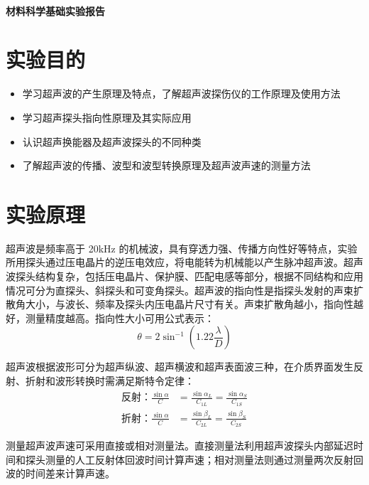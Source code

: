 \documentclass[a4paper,utf8]{article}
\begin{document}
\begin{center}
    {\mbox{}\\[7em]\bfseries\songti%
    材料科学基础实验报告}\\[34mm]
    \pointingbox
\end{center}\newpage
\section{实验目的}
    \begin{itemize}
        \item 学习超声波的产生原理及特点，了解超声波探伤仪的工作原理及使用方法 
        \item 学习超声探头指向性原理及其实际应用
        \item 认识超声换能器及超声波探头的不同种类
        \item 了解超声波的传播、波型和波型转换原理及超声波声速的测量方法
    \end{itemize}
\section{实验原理}%
    超声波是频率高于 20kHz 的机械波，具有穿透力强、传播方向性好等特点，实验所用探头通过压电晶片的逆压电效应，将电能转为机械能以产生脉冲超声波。超声波探头结构复杂，包括压电晶片、保护膜、匹配电感等部分，根据不同结构和应用情况可分为直探头、斜探头和可变角探头。超声波的指向性是指探头发射的声束扩散角大小，与波长、频率及探头内压电晶片尺寸有关。声束扩散角越小，指向性越好，测量精度越高。指向性大小可用公式表示：
    \begin{equation}
        \theta=2\sin^{-1}\left(1.22\frac\lambda D\right)
    \end{equation}\par
    超声波根据波形可分为超声纵波、超声横波和超声表面波三种，在介质界面发生反射、折射和波形转换时需满足斯特令定律：
    \begin{equation}
        \begin{aligned}
            \text{反射：}\frac{\sin\alpha}C&=\frac{\sin\alpha_L}{C_{1L}}=\frac{\sin\alpha_S}{C_{1S}}\\
            \text{折射：}\frac{\sin\alpha}C&=\frac{\sin\beta_L}{C_{2L}}=\frac{\sin\beta_S}{C_{2S}}
        \end{aligned}
    \end{equation}\par
    测量超声波声速可采用直接或相对测量法。直接测量法利用超声波探头内部延迟时间和探头测量的人工反射体回波时间计算声速；相对测量法则通过测量两次反射回波的时间差来计算声速。
\end{document}
